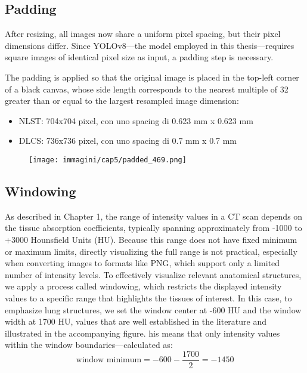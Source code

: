 \subsection*{Padding}
After resizing, all images now share a uniform pixel spacing, but their pixel dimensions differ. Since YOLOv8—the model employed in this thesis—requires square images of identical pixel size as input, a padding step is necessary.

The padding is applied so that the original image is placed in the top-left corner of a black canvas, whose side length corresponds to the nearest multiple of 32 greater than or equal to the largest resampled image dimension:
\begin{itemize}
    \item{NLST}: 704x704 pixel, con uno spacing di 0.623 mm x 0.623 mm
    \item{DLCS}: 736x736 pixel, con uno spacing di 0.7 mm x 0.7 mm
\end{itemize}

\begin{figure}[!ht]
    \centering 
    \texttt{[image: immagini/cap5/padded\_469.png]}
    \caption{}
\end{figure}

\subsection*{Windowing}
As described in Chapter 1, the range of intensity values in a CT scan depends on the tissue absorption coefficients, typically spanning approximately from -1000 to +3000 Hounsfield Units (HU). Because this range does not have fixed minimum or maximum limits, directly visualizing the full range is not practical, especially when converting images to formats like PNG, which support only a limited number of intensity levels.
To effectively visualize relevant anatomical structures, we apply a process called windowing, which restricts the displayed intensity values to a specific range that highlights the tissues of interest. In this case, to emphasize lung structures, we set the window center at -600 HU and the window width at 1700 HU, values that are well established in the literature and illustrated in the accompanying figure.
his means that only intensity values within the window boundaries—calculated as:
\begin{equation*}
    \text{window minimum} = -600 - \dfrac{1700}{2} = -1450
\end{equation*}

